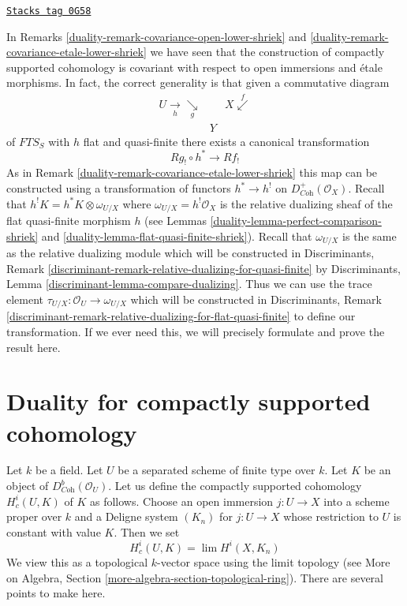 \begin{remark}
\label{duality-remark-covariance-lower-shriek}
\href{https://stacks.math.columbia.edu/tag/0G58}{\texttt{Stacks tag 0G58}}

In Remarks \ref{duality-remark-covariance-open-lower-shriek} and
\ref{duality-remark-covariance-etale-lower-shriek} we have seen
that the construction of compactly supported cohomology is
covariant with respect to open immersions and \'etale morphisms.
In fact, the correct generality is that given a commutative diagram
$$
\begin{array}{ccc}U \underset{h}{\longrightarrow}\underset{g}{\searrow} &  & X \overset{f}{\swarrow} \\  & Y & \end{array}
$$
of $\textit{FTS}_S$ with $h$ flat and quasi-finite there exists a
canonical transformation
$$
Rg_! \circ h^* \longrightarrow Rf_!
$$
As in Remark \ref{duality-remark-covariance-etale-lower-shriek}
this map can be constructed using a transformation of functors
$h^* \to h^!$ on $D^+_{\textit{Coh}}(\mathcal{O}_X)$. Recall that
$h^!K = h^*K \otimes \omega_{U/X}$ where $\omega_{U/X} = h^!\mathcal{O}_X$
is the relative dualizing sheaf of the flat quasi-finite morphism $h$ (see
Lemmas \ref{duality-lemma-perfect-comparison-shriek} and
\ref{duality-lemma-flat-quasi-finite-shriek}).
Recall that $\omega_{U/X}$ is the same as the relative dualizing
module which will be constructed in Discriminants, Remark
\ref{discriminant-remark-relative-dualizing-for-quasi-finite}
by
Discriminants, Lemma \ref{discriminant-lemma-compare-dualizing}.
Thus we can use the trace element
$\tau_{U/X} : \mathcal{O}_U \to \omega_{U/X}$
which will be constructed in Discriminants, Remark
\ref{discriminant-remark-relative-dualizing-for-flat-quasi-finite}
to define our transformation.
If we ever need this, we will precisely formulate
and prove the result here.
\end{remark}

\section{Duality for compactly supported cohomology}
\label{duality-section-duality-compactly-supported}
Let $k$ be a field. Let $U$ be a separated scheme of finite type over $k$.
Let $K$ be an object of $D^b_{\textit{Coh}}(\mathcal{O}_U)$. Let us define
the compactly supported cohomology $H^i_c(U, K)$ of $K$ as follows.
Choose an open immersion $j : U \to X$ into a scheme proper over $k$
and a Deligne system $(K_n)$ for $j : U \to X$ whose restriction
to $U$ is constant with value $K$. Then we set
$$
H^i_c(U, K) = \lim H^i(X, K_n)
$$
We view this as a topological $k$-vector space using the limit topology
(see More on Algebra, Section \ref{more-algebra-section-topological-ring}).
There are several points to make here.

